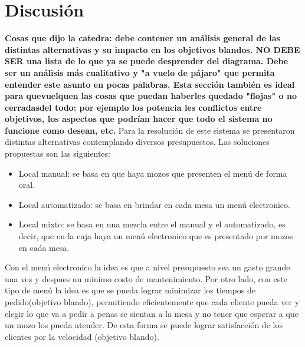\documentclass[a4paper,10pt]{article}
\begin{document}
\newpage
\section*{Discusi\'on}

\textbf{Cosas que dijo la catedra: debe contener un análisis general de las distintas alternativas y su impacto en los objetivos blandos. NO DEBE SER una lista de lo que ya se puede desprender del diagrama. Debe ser un análisis más cualitativo y "a vuelo de pájaro" que permita entender este asunto en pocas palabras. Esta sección también es ideal para quevuelquen las cosas que puedan haberles quedado "flojas" o no cerradasdel todo: por ejemplo los potencia les conflictos entre objetivos, los aspectos que podrían hacer que todo el sistema no funcione como desean, etc.}
Para la resoluci\'on de este sistema se presentaron distintas alternativas contemplando diversos presupuestos. Las soluciones propuestas son las siguientes:
\begin{itemize}
\item Local manual: se basa en que haya mozos que presenten el men\'u de forma oral.
\item Local automatizado: se basa en brindar en cada mesa un men\'u electronico.
\item Local mixto: se basa en una mezcla entre el manual y el automatizado, es decir, que en la caja haya un men\'u electronico que es presentado por mozos en cada mesa.
\end{itemize}


Con el men\'u electronico la idea es que a nivel presupuesto sea un gasto grande una vez y despues un minimo costo de mantenimiento. Por otro lado, con este tipo de men\'u la idea es que se pueda lograr minimizar los tiempos de pedido(objetivo blando), permitiendo eficientemente que cada cliente pueda ver y elegir lo que va a pedir a penas se sientan a la mesa y no tener que esperar a que un mozo los pueda atender. De esta forma se puede lograr satisfacci\'on de los clientes por la velocidad (objetivo blando). 
\end{document}

